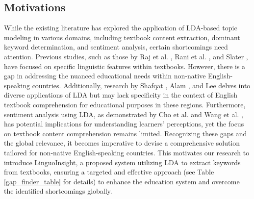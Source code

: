\documentclass[sn-mathphys,Numbered]{sn-jnl}%
\theoremstyle{thmstyleone}%
\theoremstyle{thmstyletwo}%
\theoremstyle{thmstylethree}%
\begin{document}
\subsection{Motivations}\label{motivations}
While the existing literature has explored the application of LDA-based topic modeling in various domains, including textbook content extraction, dominant keyword determination, and sentiment analysis, certain shortcomings need attention. Previous studies, such as those by Raj et al. \cite{raj_p_m_sentiment_2022}, Rani et al. \cite{rani_extractive_2021}, and Slater \cite{slater_using_2017}, have focused on specific linguistic features within textbooks. However, there is a gap in addressing the nuanced educational needs within non-native English-speaking countries. Additionally, research by Shafqat \cite{shafqat2019topic}, Alam \cite{alam_bangla_2020}, and Lee \cite{lee_lda_based_2022} delves into diverse applications of LDA but may lack specificity in the context of English textbook comprehension for educational purposes in these regions. Furthermore, sentiment analysis using LDA, as demonstrated by Cho et al. \cite{farkhod_lda_based_2021} and Wang et al. \cite{wang_exploring_2022}, has potential implications for understanding learners' perceptions, yet the focus on textbook content comprehension remains limited. Recognizing these gaps and the global relevance, it becomes imperative to devise a comprehensive solution tailored for non-native English-speaking countries. This motivates our research to introduce LinguoInsight, a proposed system utilizing LDA to extract keywords from textbooks, ensuring a targeted and effective approach (see Table \ref{gap_finder_table} for details) to enhance the education system and overcome the identified shortcomings globally.\\
\end{document}
